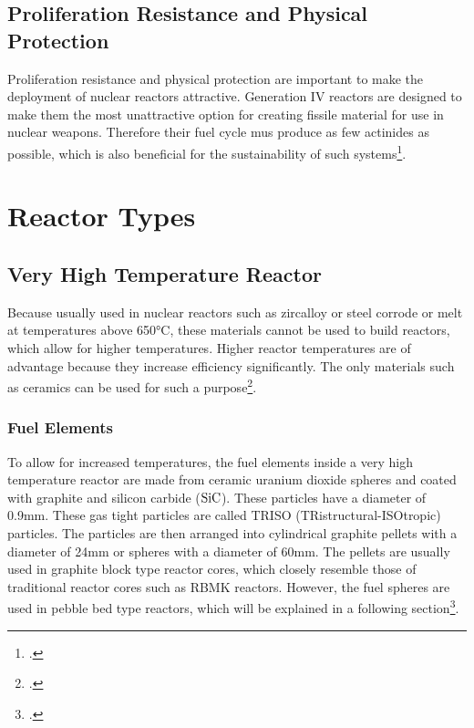 \subsection{Proliferation Resistance and Physical Protection}
Proliferation resistance and physical protection are important to make the deployment of nuclear reactors
attractive. Generation IV reactors are designed to make them the most unattractive option for creating
fissile material for use in nuclear weapons. Therefore their fuel cycle mus produce as few actinides
as possible, which is also beneficial for the sustainability of such systems\footcite[39]{IVHandbook}.
\section{Reactor Types}
\subsection{Very High Temperature Reactor}
Because usually used in nuclear reactors such as zircalloy or steel corrode or melt at temperatures
above 650°C, these materials cannot be used to build reactors, which allow for higher temperatures.
Higher reactor temperatures are of advantage because they increase efficiency significantly. The
only materials such as ceramics can be used for such a purpose\footcite[55]{T4Gen}.
\subsubsection{Fuel Elements}
To allow for increased temperatures, the fuel elements inside a very high temperature reactor are made
from ceramic uranium dioxide spheres and coated with graphite and silicon carbide ($\ce{SiC}$). These
particles have a diameter of 0.9mm. These gas tight particles are called TRISO (TRistructural-ISOtropic) particles.
The particles are then arranged into cylindrical graphite
pellets with a diameter of 24mm or spheres with a diameter of 60mm. The pellets are usually used in
graphite block type reactor cores, which closely resemble those of traditional reactor cores such
as RBMK reactors. However, the fuel spheres are used in pebble bed type reactors, which will be explained
in a following section\footcite[56]{T4Gen}.
